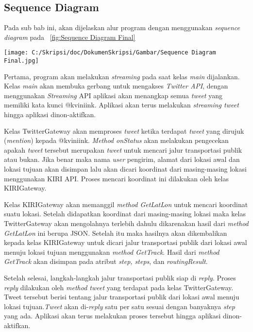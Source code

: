 \subsection{Sequence Diagram}

Pada sub bab ini, akan dijelaskan alur program dengan menggunakan \textit{sequence diagram} pada ~\ref{fig:Sequence Diagram Final}

\begin{sidewaysfigure}[htbp]
	\centering
		\texttt{[image: C:/Skripsi/doc/DokumenSkripsi/Gambar/Sequence Diagram Final.jpg]}
	\caption{Sequence Diagram Twitter Bot untuk Mencari Jalur Transportasi Publik}
	\label{fig:Sequence Diagram Final}
\end{sidewaysfigure}


Pertama, program akan melakukan \textit{streaming} pada saat kelas \textit{main} dijalankan. Kelas \textit{main} akan membuka gerbang untuk mengakses \textit{Twitter API}, dengan menggunakan \textit{Streaming} API aplikasi akan menangkap semua \textit{tweet} yang memiliki kata kunci @kviniink. Aplikasi akan terus melakukan \textit{streaming tweet} hingga aplikasi dinon-aktifkan.

Kelas TwitterGateway akan memproses \textit{tweet} ketika terdapat \textit{tweet} yang dirujuk (\textit{mention}) kepada @kviniink. \textit{Method onStatus} akan melakukan pengecekan apakah \textit{tweet} tersebut merupakan \textit{tweet} untuk mencari jalur transportasi publik atau bukan. Jika benar maka nama \textit{user} pengirim, alamat dari lokasi awal dan lokasi tujuan akan disimpan lalu akan dicari koordinat dari masing-masing lokasi menggunakan KIRI API. Proses mencari koordinat ini dilakukan oleh kelas KIRIGateway.

Kelas KIRIGateway akan memanggil \textit{method GetLatLon} untuk mencari koordinat suatu lokasi. Setelah didapatkan koordinat dari masing-masing lokasi maka kelas TwitterGateway akan mengolahnya terlebih dahulu dikarenakan hasil dari \textit{method GetLatLon} ini berupa JSON. Setelah itu maka hasilnya akan dikembalikan kepada kelas KIRIGateway untuk dicari jalur transportasi publik dari lokasi awal menuju lokasi tujuan menggunakan \textit{method GetTrack}. Hasil dari \textit{method GetTrack} akan disimpan pada atribut \textit{step, steps}, dan \textit{routingResult}.

Setelah selesai, langkah-langkah jalur transportasi publik siap di \textit{reply}. Proses \textit{reply} dilakukan oleh \textit{method tweet} yang terdapat pada kelas TwitterGateway. Tweet tersebut berisi tentang jalur transportasi publik dari lokasi awal menuju lokasi tujuan.\textit{Tweet} akan di-\textit{reply} satu per satu sesuai dengan banyaknya \textit{step} yang ada. Aplikasi akan terus melakukan proses tersebut hingga aplikasi dinon-aktifkan.

